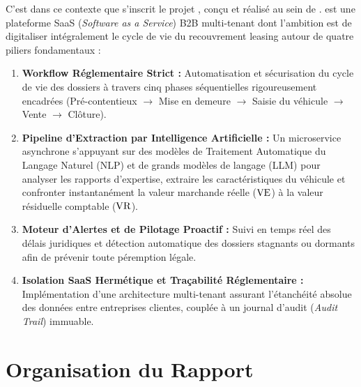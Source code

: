 C'est dans ce contexte que s'inscrit le projet \textbf{\projectShortTitle}, conçu et réalisé au sein de \textbf{\hostCompany}. \projectShortTitle{} est une plateforme SaaS (\textit{Software as a Service}) B2B multi-tenant dont l'ambition est de digitaliser intégralement le cycle de vie du recouvrement leasing autour de quatre piliers fondamentaux :
\begin{enumerate}
    \item \textbf{Workflow Réglementaire Strict :} Automatisation et sécurisation du cycle de vie des dossiers à travers cinq phases séquentielles rigoureusement encadrées (Pré-contentieux $\rightarrow$ Mise en demeure $\rightarrow$ Saisie du véhicule $\rightarrow$ Vente $\rightarrow$ Clôture).
    \item \textbf{Pipeline d'Extraction par Intelligence Artificielle :} Un microservice asynchrone s'appuyant sur des modèles de Traitement Automatique du Langage Naturel (NLP) et de grands modèles de langage (LLM) pour analyser les rapports d'expertise, extraire les caractéristiques du véhicule et confronter instantanément la valeur marchande réelle ($\text{VE}$) à la valeur résiduelle comptable ($\text{VR}$).
    \item \textbf{Moteur d'Alertes et de Pilotage Proactif :} Suivi en temps réel des délais juridiques et détection automatique des dossiers stagnants ou dormants afin de prévenir toute péremption légale.
    \item \textbf{Isolation SaaS Hermétique et Traçabilité Réglementaire :} Implémentation d'une architecture multi-tenant assurant l'étanchéité absolue des données entre entreprises clientes, couplée à un journal d'audit (\textit{Audit Trail}) immuable.
\end{enumerate}

\section*{Organisation du Rapport}

